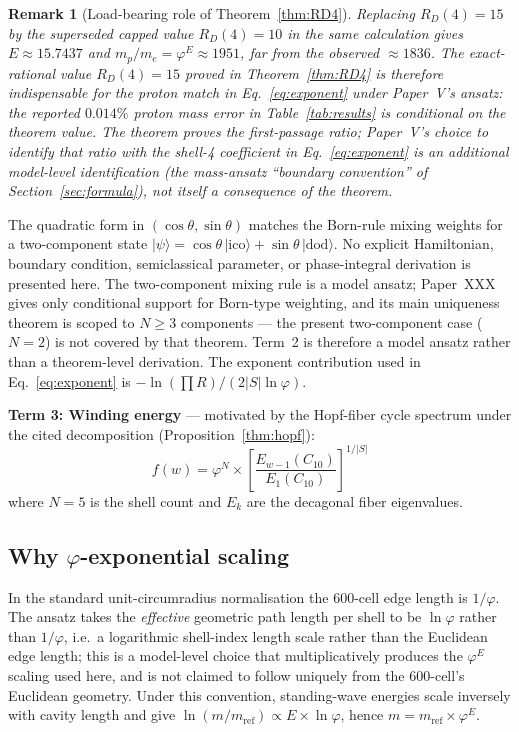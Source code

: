 \documentclass[12pt]{article}
\newtheorem{remark}[theorem]{Remark}
\newcommand{\phig}{\varphi}
\begin{document}
\begin{remark}[Load-bearing role of Theorem~\ref{thm:RD4}]
Replacing $R_D(4) = 15$ by the superseded capped value $R_D(4) = 10$ in the same calculation gives $E \approx 15.7437$ and $m_p / m_e = \phig^E \approx 1951$, far from the observed $\approx 1836$. The exact-rational value $R_D(4) = 15$ proved in Theorem~\ref{thm:RD4} is therefore indispensable for the proton match in Eq.~\eqref{eq:exponent} under Paper~V's ansatz: the reported $0.014\%$ proton mass error in Table~\ref{tab:results} is conditional on the theorem value. The theorem proves the first-passage ratio; Paper~V's choice to identify that ratio with the shell-4 coefficient in Eq.~\eqref{eq:exponent} is an additional model-level identification (the mass-ansatz ``boundary convention'' of Section~\ref{sec:formula}), not itself a consequence of the theorem.
\end{remark}
The quadratic form in $(\cos\theta, \sin\theta)$ matches the Born-rule mixing weights for a two-component state $|\psi\rangle = \cos\theta\,|\text{ico}\rangle + \sin\theta\,|\text{dod}\rangle$. No explicit Hamiltonian, boundary condition, semiclassical parameter, or phase-integral derivation is presented here. The two-component mixing rule is a model ansatz; Paper~XXX~\citep{SmartXXX} gives only conditional support for Born-type weighting, and its main uniqueness theorem is scoped to $N \geq 3$ components --- the present two-component case ($N = 2$) is not covered by that theorem. Term~2 is therefore a model ansatz rather than a theorem-level derivation. The exponent contribution used in Eq.~\eqref{eq:exponent} is $-\ln(\prod R)/(2|S|\ln\phig)$.

\textbf{Term 3: Winding energy} --- motivated by the Hopf-fiber cycle spectrum under the cited decomposition (Proposition~\ref{thm:hopf}):
\begin{equation}\label{eq:winding}
    f(w) = \phig^N \times \left[\frac{E_{w-1}(C_{10})}{E_1(C_{10})}\right]^{1/|S|}
\end{equation}
where $N = 5$ is the shell count and $E_k$ are the decagonal fiber eigenvalues.

\subsection{Why $\phig$-exponential scaling}

In the standard unit-circumradius normalisation the 600-cell edge length is $1/\phig$. The ansatz takes the \emph{effective} geometric path length per shell to be $\ln\phig$ rather than $1/\phig$, i.e.\ a logarithmic shell-index length scale rather than the Euclidean edge length; this is a model-level choice that multiplicatively produces the $\phig^E$ scaling used here, and is not claimed to follow uniquely from the 600-cell's Euclidean geometry. Under this convention, standing-wave energies scale inversely with cavity length and give $\ln(m/m_{\mathrm{ref}}) \propto E \times \ln\phig$, hence $m = m_{\mathrm{ref}} \times \phig^E$.
\end{document}
